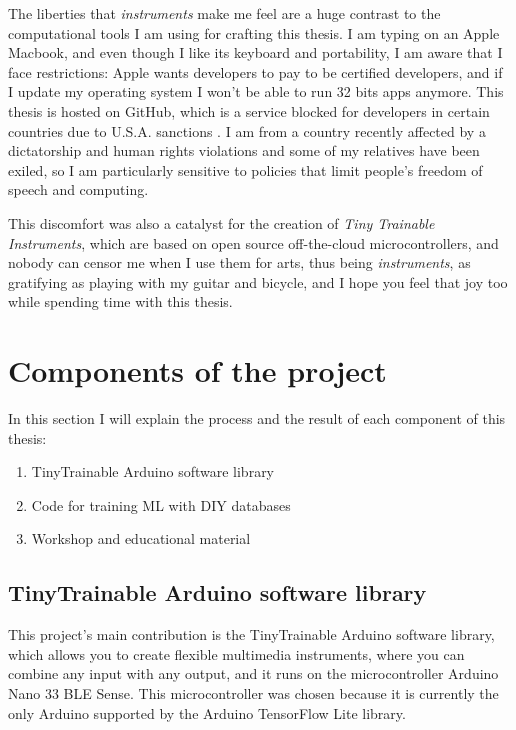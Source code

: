 The liberties that \emph{instruments} make me feel are a huge contrast to the computational tools I am using for crafting this thesis. I am typing on an Apple Macbook, and even though I like its keyboard and portability, I am aware that I face restrictions: Apple wants developers to pay to be certified developers, and if I update my operating system I won't be able to run 32 bits apps anymore. This thesis is hosted on GitHub, which is a service blocked for developers in certain countries due to U.S.A. sanctions \cite{website-github-trade-controls}. I am from a country recently affected by a dictatorship and human rights violations and some of my relatives have been exiled, so I am particularly sensitive to policies that limit people's freedom of speech and computing.

This discomfort was also a catalyst for the creation of \textit{Tiny Trainable Instruments}, which are based on open source off-the-cloud microcontrollers, and nobody can censor me when I use them for arts, thus being \emph{instruments}, as gratifying as playing with my guitar and bicycle, and I hope you feel that joy too while spending time with this thesis.

\section{Components of the project}

In this section I will explain the process and the result of each component of this thesis:

\begin{enumerate}
  \item TinyTrainable Arduino software library
  \item Code for training \acrshort{ML} with \acrshort{DIY} databases
  \item Workshop and educational material
\end{enumerate}

\subsection{TinyTrainable Arduino software library}

This project's main contribution is the TinyTrainable Arduino software library, which allows you to create flexible multimedia instruments, where you can combine any input with any output, and it runs on the microcontroller Arduino Nano 33 BLE Sense. This microcontroller was chosen because it is currently the only Arduino supported by the Arduino TensorFlow Lite library.

